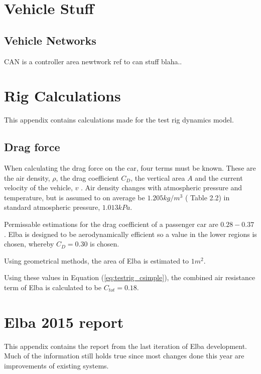 \chapter{Vehicle Stuff} \label{appA}

\section{Vehicle Networks}
CAN is a controller area newtwork ref to can stuff blaha..

\chapter{Rig Calculations} \label{app:rigdata}
This appendix contains calculations made for the test rig dynamics model. 

\section*{Drag force}
When calculating the drag force on the car, four terms must be known.
These are the air density, $\rho$, the drag coefficient $C_D$, the vertical area
$A$ and the current velocity of the vehicle, $v$ \cite{nakayama2002}. Air
density changes with atmospheric pressure and temperature, but is assumed to on
average be $1.205\si{kg/m^3}$ (\cite{nakayama2002} Table 2.2) in standard
atmospheric pressure, $1.013\si{kPa}$. 

Permissable estimations for the drag coefficient of a passenger car are
$0.28-0.37$ \cite{nakayama2002}. Elba is designed to be aerodynamically
efficient so a value in the lower regions is chosen, whereby $C_D = 0.30$ is
chosen.

Using geometrical methods, the area of Elba is estimated to $1\si{m^2}$.

Using these values in Equation (\ref{eq:testrig_csimple}), the combined air
resistance term of Elba is calculated to be $C_{tot} = 0.18$.



\chapter{Elba 2015 report} \label{app:elba2015}
This appendix contains the report from the last iteration of Elba development.
Much of the information still holds true since most changes done this year are
improvements of existing systems.

